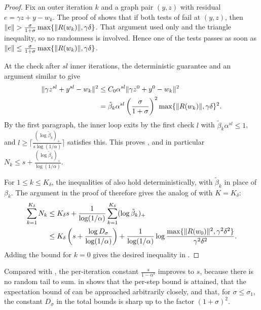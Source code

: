 \documentclass[11pt]{article}
\begin{document}
\begin{proof}
    Fix an outer iteration $k$ and a graph pair $(y,z)$ with residual $e = \gamma z + y - w_k$.
    The proof of  shows that if both tests of  fail at $(y,z)$, then $\lVert e\rVert > \frac{\sigma}{1+\sigma}\max\{\lVert R(w_k)\rVert,\gamma\delta\}$.
    That argument used only  and the triangle inequality, so no randomness is involved.
    Hence one of the tests passes as soon as $\lVert e\rVert\leq\frac{\sigma}{1+\sigma}\max\{\lVert R(w_k)\rVert,\gamma\delta\}$.

    At the check after $sl$ inner iterations, the deterministic guarantee and an argument similar to  give
    \begin{align}
        \lVert\gamma z^{sl} + y^{sl} - w_k\rVert^2 &\leq C_0\alpha^{sl}\lVert\gamma z^0 + y^0 - w_k\rVert^2 \\
        &= \tilde{\beta}_k\alpha^{sl}\left(\frac{\sigma}{1+\sigma}\right)^2\max\{\lVert R(w_k)\rVert,\gamma\delta\}^2.
    \end{align}
    By the first paragraph, the inner loop exits by the first check $l$ with $\tilde{\beta}_k\alpha^{sl}\leq1$, and $l \geq \lceil\frac{ (\log\tilde{\beta}_k)_+ }{s\log(1/\alpha)}\rceil$ satisfies this.
    This proves , and in particular $N_k\leq s + \frac{ (\log\tilde{\beta}_k)_+ }{\log(1/\alpha)}$.

    For $1\leq k\leq K_\delta$, the inequalities of  also hold deterministically, with $\tilde\beta_k$ in place of $\beta_k$.
    The argument in the proof of  therefore gives the analog of  with $K = K_\delta$:
    \begin{align}
        \sum_{k=1}^{K_\delta}N_k &\leq K_\delta s + \frac{1}{\log(1/\alpha)}\sum_{k=1}^{K_\delta} (\log\tilde{\beta}_k)_+  \\
        &\leq K_\delta\left(s + \frac{ \log D_{\sigma} }{\log(1/\alpha)}\right) + \frac{1}{\log(1/\alpha)}\log\frac{\max\{\lVert R(w_0)\rVert^2,\gamma^2\delta^2\}}{\gamma^2\delta^2}.
    \end{align}
    Adding the bound  for $k=0$ gives the desired inequality in .
\end{proof}
\begin{remark}
    Compared with , the per-iteration constant $\frac{s}{1-\alpha^s}$ improves to $s$, because there is no random tail to sum.
     in  shows that the per-step bound  is attained, that the expectation bound of  can be approached arbitrarily closely, and that, for $\sigma\leq\sigma_1$, the constant $D_\sigma$ in the total bounds is sharp up to the factor $(1+\sigma)^2$.
\end{remark}
\end{document}
